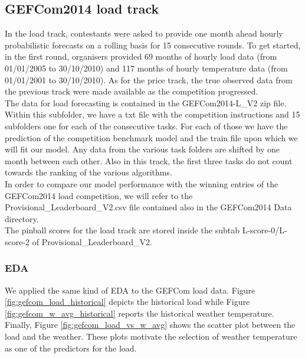 \subsection{GEFCom2014 load track}
In the load track, contestants were asked to provide one month ahead hourly probabilistic forecasts on a rolling basis for 15 consecutive rounds. To get started, in the first round, organisers provided 69 months of hourly load data (from 01/01/2005 to 30/10/2010) and 117 months of hourly temperature data (from 01/01/2001 to 30/10/2010). 
As for the price track, the true observed data from the previous track were made available as the competition progressed.
\\
The data for load forecasting is contained in the GEFCom2014-L\_V2 zip file. Within this subfolder, we have a txt file with the competition instructions and 15 subfolders one for each of the consecutive tasks. For each of those we have the prediction of the competition benchmark model and the train file upon which we will fit our model.
Any data from the various task folders are shifted by one month between each other.
Also in this track, the first three tasks do not count towards the ranking of the various algorithms.
\\
In order to compare our model performance with the winning entries of the GEFCom2014 load competition, we will refer to the Provisional\_Leaderboard\_\-V2.csv file contained also in the GEFCom2014 Data directory.
\\
The pinball scores for the load track are stored inside the subtab L-score-0/L-score-2 of Provisional\_Leaderboard\_V2.
\subsubsection{EDA}
We applied the same kind of EDA to the GEFCom load data. Figure \ref{fig:gefcom_load_historical} depicts the historical load while Figure \ref{fig:gefcom_w_avg_historical} reports the historical weather temperature. Finally, Figure \ref{fig:gefcom_load_vs_w_avg} shows the scatter plot between the load and the weather.
These plots motivate the selection of weather temperature as one of the predictors for the load.

